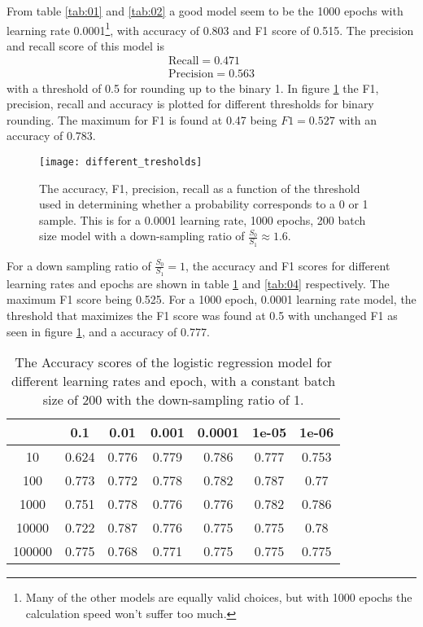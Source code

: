 \documentclass[uio,jmp,amsmath,amssymb,reprint,nofootinbib]{revtex4-1}
\numberwithin{equation}{section}
\begin{document}
From table \ref{tab:01} and \ref{tab:02} a good model seem to be the 1000 epochs with learning rate 0.0001\footnote{Many of the other models are equally valid choices, but with 1000 epochs the calculation speed won't suffer too much.}, with accuracy of 0.803 and F1 score of 0.515. The precision and recall score of this model is
\begin{align}
\text{Recall} = 0.471\\
\text{Precision} = 0.563
\end{align}
with a threshold of 0.5 for rounding up to the binary 1. In figure \ref{fig:03} the F1, precision, recall and accuracy is plotted for different thresholds for binary rounding. The maximum for F1 is found at 0.47 being \(F1 = 0.527\) with an accuracy of 0.783.

\begin{figure}[H]
    \centering
    \texttt{[image: different\_tresholds]}
    \caption{The accuracy, F1, precision, recall as a function of the threshold used in determining whether a probability corresponds to a 0 or 1 sample. This is for a 0.0001 learning rate, 1000 epochs, 200 batch size model with a down-sampling ratio of \(\frac{S_0}{S_1} \approx 1.6\).}
    \label{fig:03}
\end{figure}


For a down sampling ratio of \(\frac{S_0}{S_1} = 1\), the accuracy and F1 scores for different learning rates and epochs are shown in table \ref{tab:03} and \ref{tab:04} respectively. The maximum F1 score being 0.525. For a 1000 epoch, 0.0001 learning rate model, the threshold that maximizes the F1 score was found at 0.5 with unchanged F1 as seen in figure \ref{fig:03}, and a accuracy of 0.777.


\begin{table}[H]
\caption{The Accuracy scores of the logistic regression model for different learning rates and epoch, with a constant batch size of 200 with the down-sampling ratio of 1.}
\begin{tabular}{|c|c|c|c|c|c|c|}\hline
  & 0.1 & 0.01 & 0.001 & 0.0001 & 1e-05 & 1e-06 \\ \hline
10 & 0.624 & 0.776 & 0.779 & 0.786 & 0.777 & 0.753 \\ \hline
100 & 0.773 & 0.772 & 0.778 & 0.782 & 0.787 & 0.77 \\ \hline
1000 & 0.751 & 0.778 & 0.776 & 0.776 & 0.782 & 0.786 \\ \hline
10000 & 0.722 & 0.787 & 0.776 & 0.775 & 0.775 & 0.78 \\ \hline
100000 & 0.775 & 0.768 & 0.771 & 0.775 & 0.775 & 0.775 \\ \hline
\end{tabular}
\label{tab:03}
\end{table}
\end{document}
